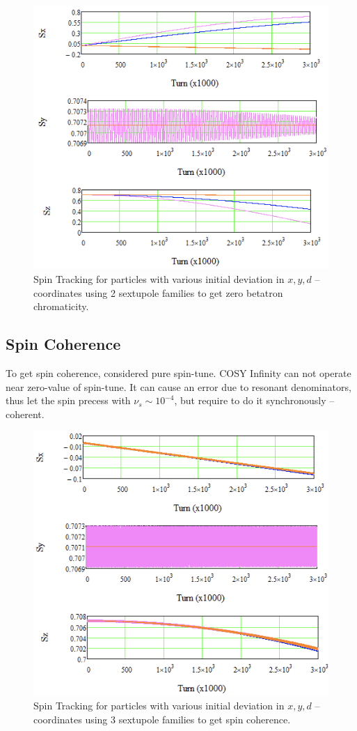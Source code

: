 \documentclass[a4paper]{jpconf}
\begin{document}
\begin{figure}[!h]
   \centering
   \includegraphics*[width=0.87\columnwidth]{fig5}
   \caption{Spin Tracking for particles with various initial deviation in $x, y, d$ -- coordinates using 2 sextupole families to get zero betatron chromaticity.}
   \label{fig:STincoherence}
\end{figure}

\subsection{Spin Coherence}

\par To get spin coherence, considered pure spin-tune. COSY Infinity can not operate near zero-value of spin-tune.
It can cause an error due to resonant denominators, thus let the spin precess with $\nu_{s}\sim10^{-4}$, but require to do it synchronously -- coherent.

\begin{figure}[!h]
   \centering
   \includegraphics*[width=0.87\columnwidth]{fig6}
   \caption{Spin Tracking for particles with various initial deviation in $x, y, d$ -- coordinates using 3 sextupole families to get spin coherence.}
   \label{fig:STcoherence}
\end{figure}
\end{document}
